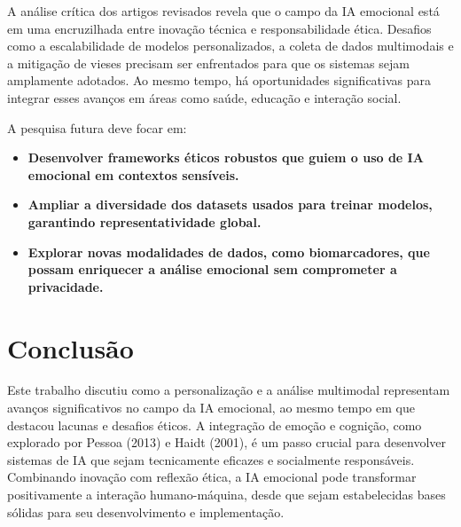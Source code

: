\documentclass[a4paper,12pt]{report}
\begin{document}
	A análise crítica dos artigos revisados revela que o campo da IA emocional está em uma encruzilhada entre inovação técnica e responsabilidade ética. Desafios como a escalabilidade de modelos personalizados, a coleta de dados multimodais e a mitigação de vieses precisam ser enfrentados para que os sistemas sejam amplamente adotados. Ao mesmo tempo, há oportunidades significativas para integrar esses avanços em áreas como saúde, educação e interação social.
	
	A pesquisa futura deve focar em:
	
		\begin{itemize}
		\item \textbf{Desenvolver frameworks éticos robustos que guiem o uso de IA emocional em contextos sensíveis.}
		\item \textbf{Ampliar a diversidade dos datasets usados para treinar modelos, garantindo representatividade global.}
		\item \textbf{Explorar novas modalidades de dados, como biomarcadores, que possam enriquecer a análise emocional sem comprometer a privacidade.}
		\end{itemize}
		
	
	\section{Conclusão}
	
	Este trabalho discutiu como a personalização e a análise multimodal representam avanços significativos no campo da IA emocional, ao mesmo tempo em que destacou lacunas e desafios éticos. A integração de emoção e cognição, como explorado por Pessoa (2013) e Haidt (2001), é um passo crucial para desenvolver sistemas de IA que sejam tecnicamente eficazes e socialmente responsáveis. Combinando inovação com reflexão ética, a IA emocional pode transformar positivamente a interação humano-máquina, desde que sejam estabelecidas bases sólidas para seu desenvolvimento e implementação. 
	
	\newpage
	
	\printbibliography
	
\end{document}
